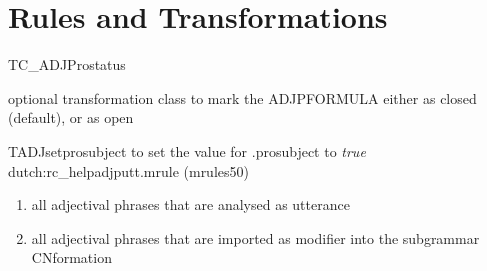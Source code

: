 \section{Rules and Transformations}
\begin{mruleclass}{TC\_ADJProstatus}
\begin{classdescr}
\kind optional transformation class
\classtask to mark the ADJPFORMULA either as closed  (default), or as open
\classremarks

\nofilters

\nospeedrules

\noplannedrules

\norulesnotince


\end{classdescr}

\begin{members}
\begin{member}
 TADJsetprosubject
 to set the value for .prosubject to {\em true}
\file dutch:rc\_helpadjputt.mrule (mrules50)
\semantics \nosemantics
\example \mbox{}
\begin{enumerate}
\item
 all adjectival phrases that are analysed as utterance 
\item
all adjectival phrases that are imported as modifier into the subgrammar
CNformation
\end{enumerate}
\remarks\mbox{}
\end{member}
\end{members}
\end{mruleclass}


